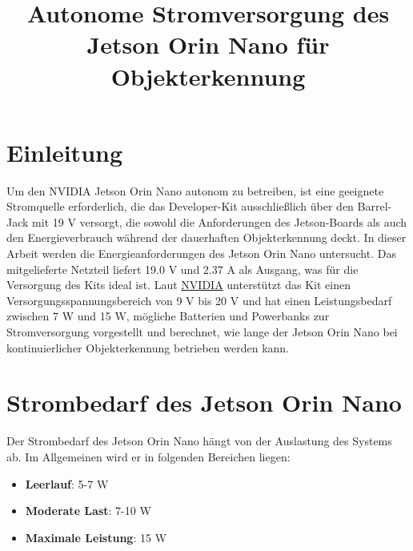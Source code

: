 \documentclass[12pt]{article}
\title{Autonome Stromversorgung des Jetson Orin Nano für Objekterkennung}
\author{}
\date{}
\begin{document}
\maketitle

\section{Einleitung}
Um den NVIDIA Jetson Orin Nano autonom zu betreiben, ist eine geeignete Stromquelle erforderlich, 
die das Developer-Kit ausschließlich über den Barrel-Jack mit 19 V versorgt, 
die sowohl die Anforderungen des Jetson-Boards als auch den Energieverbrauch 
während der dauerhaften Objekterkennung deckt. In dieser Arbeit werden die Energieanforderungen 
des Jetson Orin Nano untersucht. Das mitgelieferte Netzteil liefert 19.0 V und 2.37 A als Ausgang, 
was für die Versorgung des Kits ideal ist. Laut \textcolor{blue}{\href{https://developer.download.nvidia.com/assets/embedded/secure/jetson/orin_nano/docs/Jetson-Orin-Nano-DevKit-Carrier-Board-Specification_SP-11324-001_v1.2.pdf?KmgI9RJCufnwzXmxbGPExVQp1r131wrAPSzR9RMDhh83EhjqXKmYVbjwEjUNXPMiO3peL2R_7D_xp9mFQTBkPF-Bon3l72rEZPIiNTVUv5oIjQsvFsQ0pqAZxr16W-12GNU3N596RY1rC1tgxd5_XwyvJRNhcRcOank-v-QwQweH0clhI5Vvdy5dZVF-qYLeuslCScepJxD-v-TAHS2XuNFpJb69-WoTOPi_AyxiG2scwgKnqQ==&t=eyJscyI6IndlYnNpdGUiLCJsc2QiOiJkZXZlbG9wZXIubnZpZGlhLmNvbS9lbWJlZGRlZC9kb3dubG9hZHMjP3NlYXJjaD1EYXRhJTIwU2hlZXRcdTAwMjZ0eD0kcHJvZHVjdCxqZXRzb25fYWd4X29yaW4samV0c29uX29yaW5fbngsamV0c29uX29yaW5fbmFubyJ9}{NVIDIA}} 
unterstützt das Kit einen Versorgungsspannungsbereich von 9 V bis 20 V und hat einen Leistungsbedarf 
zwischen 7 W und 15 W, mögliche Batterien und Powerbanks zur Stromversorgung vorgestellt und berechnet, 
wie lange der Jetson Orin Nano bei kontinuierlicher Objekterkennung betrieben werden kann.

\section{Strombedarf des Jetson Orin Nano}
Der Strombedarf des Jetson Orin Nano hängt von der Auslastung des Systems ab. 
Im Allgemeinen wird er in folgenden Bereichen liegen:

\begin{itemize}
    \item \textbf{Leerlauf}: 5-7 W
    \item \textbf{Moderate Last}: 7-10 W
    \item \textbf{Maximale Leistung}: 15 W 
\end{itemize}
\end{document}

